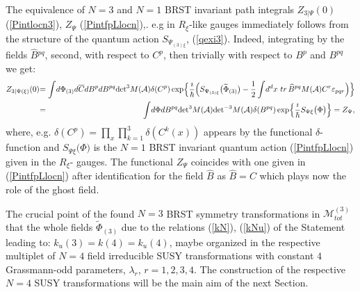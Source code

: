 \documentclass[10pt]{article}
\begin{document}
The equivalence of $N=3$ and $N=1$
 BRST invariant path integrals ${Z}_{3|\Psi}(0)$  (\ref{Pintlocn3}), $
Z_\Psi $  (\ref{PintfpLlocn}),. e.g in $R_\xi$-like gauges  immediately follows from  the structure of the quantum action $S_{\Psi_{(3)\xi}}$,   (\ref{qexi3}). Indeed, integrating by the fields $\widehat{B}{}^{pq}$, second,  with respect to $C^{p}$, then trivially  with respect  to $B^p$  and $B^{pq}$ we get:
\begin{eqnarray}%
  {Z}_{3|\Psi(\xi)}(0) \hspace{-0.25em}&=\hspace{-0.45em}& \hspace{-0.25em}\int \hspace{-0.15em}  d {\Phi}_{(3)}d \overline{C} d B^p  dB^{pq} {\det}^{3} M(\mathcal{A})  \delta(C^p) \exp \hspace{-0.15em}\Big\{\frac{\imath}{\hbar}\Big(S_{\Psi_{(3)\xi}}\big(\widetilde{\Phi}_{(3)} \big) -\frac{1}{2} \int \hspace{-0.15em} d^{d}x\ tr\, \widehat{B}{}^{pq}M(\mathcal{A}) {C}{}^{r}\varepsilon_{pqr}
  \Big)\Big\} \nonumber \\
  \hspace{-0.25em}&=\hspace{-0.45em}& \hspace{-0.25em}\int \hspace{-0.15em}  d {\Phi}d B^{pq}  {\det}^{3} M(\mathcal{A}) {\det}^{-3} M(\mathcal{A})  \delta(B^{pq})  \exp \hspace{-0.15em}\Big\{\frac{\imath}{\hbar}S_{\Psi{\xi}}\big({\Phi} \big ) \Big\} = {Z}_{\Psi},\label{N3N1eqv}
\end{eqnarray}
where, e.g. $ \delta(C^p)= \prod_x\prod_{k=1}^3\delta(C^k(x)) $ appears by the functional $\delta$-function and $S_{\Psi{\xi}}\big({\Phi} \big )$ is the $N=1$ BRST invariant  quantum action (\ref{PintfpLlocn}) given in the $R_\xi$- gauges.
The functional ${Z}_{\Psi}$ coincides with one given in (\ref{PintfpLlocn}) after identification for the field $\widehat{B}$ as $\widehat{B}=C$ which plays now the role of the ghost field.

The crucial point of the found  $N=3$ BRST symmetry transformations  in $\mathcal{M}^{(3)}_{tot}$ that  the whole  fields $\widetilde{\Phi}_{(3)}$ due to the relations (\ref{kN}), (\ref{kNu}) of the  Statement leading to: $k_u(3)= k(4)=k_u(4)$,  maybe organized in the respective multiplet  of $N=4$ field irreducible SUSY transformations with constant $4$ Grassmann-odd parameters, $\lambda_r$, $r=1,2,3,4$.   The  construction of the respective $N=4$ SUSY transformations will be  the main aim of the next Section.
\end{document}
